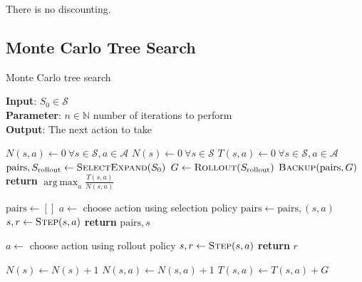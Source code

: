 \documentclass[letterpaper]{article} %
\DeclareMathOperator*{\argmax}{arg\,max}
\renewcommand{\Return}[1]{\State \textbf{return} #1}
\begin{document}
There is no discounting.

\subsection{Monte Carlo Tree Search}

\begin{algorithm}
\caption{Monte Carlo tree search}
\label{alg:mcts}
\textbf{Input}: $S_{0} \in \mathcal{S}$\\
\textbf{Parameter}: $n \in \mathbb{N}$ number of iterations to perform\\
\textbf{Output}: The next action to take
\begin{algorithmic}[1] %
\State $N(s,a) \gets 0\ \forall s \in \mathcal{S}, a \in \mathcal{A}$
\State $N(s) \gets 0\ \forall s \in \mathcal{S}$
\State $T(s,a) \gets 0\ \forall s \in \mathcal{S}, a \in \mathcal{A}$
  \State $\mathrm{pairs},S_{\mathrm{rollout}} \gets \Call{SelectExpand}{S_{0}}$
  \State $G \gets \Call{Rollout}{S_{\mathrm{rollout}}}$
  \State $\Call{Backup}{\mathrm{pairs}, G}$
\EndFor
\Return{$\argmax_{a}\frac{T(s,a)}{N(s,a)}$}

  \State $\mathrm{pairs} \gets []$
  \Repeat
    \State $a \gets$ choose action using selection policy
    \State $\mathrm{pairs} \gets \mathrm{pairs}, (s,a)$
    \State $s,r \gets \Call{Step}{s,a}$
  \Return{$\mathrm{pairs}, s$}
\EndProcedure

  \Repeat
    \State $a \gets$ choose action using rollout policy
    \State $s,r \gets \Call{Step}{s,a}$
  \Return{$r$}
\EndProcedure

    \State $N(s) \gets N(s) + 1$
    \State $N(s,a) \gets N(s,a) + 1$
    \State $T(s,a) \gets T(s,a) + G$
  \EndFor
\EndProcedure
\end{algorithmic}
\end{algorithm}
\end{document}
